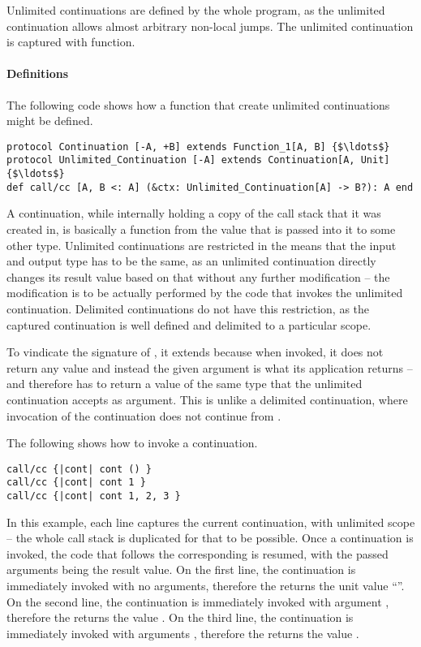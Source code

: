 Unlimited continuations are defined by the whole program, as the unlimited continuation allows almost arbitrary non-local jumps. The unlimited continuation is captured with  function. 

\paragraph{Definitions}
The following code shows how a function that create unlimited continuations might be defined. 
\begin{lstlisting}
protocol Continuation [-A, +B] extends Function_1[A, B] {$\ldots$}
protocol Unlimited_Continuation [-A] extends Continuation[A, Unit] {$\ldots$}
def call/cc [A, B <: A] (&ctx: Unlimited_Continuation[A] -> B?): A end
\end{lstlisting}

A continuation, while internally holding a copy of the call stack that it was created in, is basically a function from the value that is passed into it to some other type. Unlimited continuations are restricted in the means that the input and output type has to be the same, as an unlimited continuation directly changes its result value based on that without any further modification -- the modification is to be actually performed by the code that invokes the unlimited continuation. Delimited continuations do not have this restriction, as the captured continuation is well defined and delimited to a particular scope. 

To vindicate the signature of , it extends  because when invoked, it does not return any value and instead the given argument is what its  application returns -- and therefore  has to return a value of the same type that the unlimited continuation accepts as argument. This is unlike a delimited continuation, where invocation of the continuation does not continue from . 

\example The following shows how to invoke a continuation. 
\begin{lstlisting}
call/cc {|cont| cont () }
call/cc {|cont| cont 1 }
call/cc {|cont| cont 1, 2, 3 }
\end{lstlisting}
In this example, each line captures the current continuation, with unlimited scope -- the whole call stack is duplicated for that to be possible. Once a continuation is invoked, the code that follows the corresponding  is resumed, with the passed arguments being the result value. On the first line, the continuation is immediately invoked with no arguments, therefore the  returns the unit value ``\code{()}''. On the second line, the continuation is immediately invoked with argument , therefore the  returns the value . On the third line, the continuation is immediately invoked with arguments , therefore the  returns the value . 

